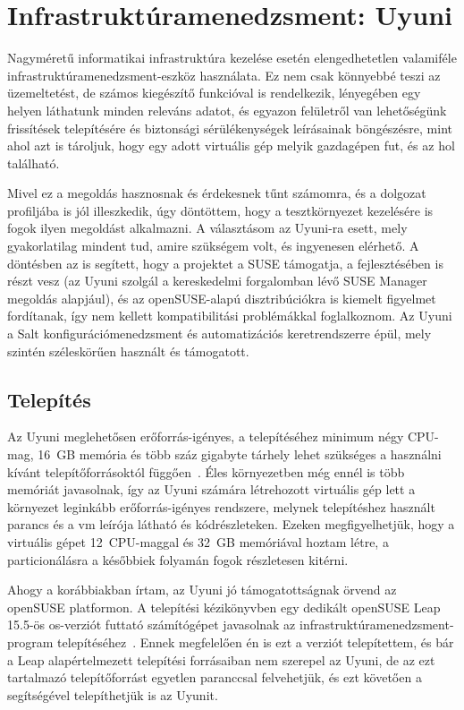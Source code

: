 
\chapter{Infrastruktúramenedzsment: Uyuni}
Nagyméretű informatikai infrastruktúra kezelése esetén elengedhetetlen valamiféle infrastruktúramenedzsment-eszköz használata. Ez nem csak könnyebbé teszi az üzemeltetést, de számos kiegészítő funkcióval is rendelkezik, lényegében egy helyen láthatunk minden releváns adatot, és egyazon felületről van lehetőségünk frissítések telepítésére és biztonsági sérülékenységek leírásainak böngészésre, mint ahol azt is tároljuk, hogy egy adott virtuális gép melyik gazdagépen fut, és az hol található.

Mivel ez a megoldás hasznosnak és érdekesnek tűnt számomra, és a dolgozat profiljába is jól illeszkedik, úgy döntöttem, hogy a tesztkörnyezet kezelésére is fogok ilyen megoldást alkalmazni. A választásom az Uyuni-ra esett, mely gyakorlatilag mindent tud, amire szükségem volt, és ingyenesen elérhető. A döntésben az is segített, hogy a projektet a SUSE támogatja, a fejlesztésében is részt vesz (az Uyuni szolgál a kereskedelmi forgalomban lévő SUSE Manager megoldás alapjául), és az openSUSE-alapú disztribúciókra is kiemelt figyelmet fordítanak, így nem kellett kompatibilitási problémákkal foglalkoznom. Az Uyuni a Salt konfigurációmenedzsment és automatizációs keretrendszerre épül, mely szintén széleskörűen használt és támogatott.


\section{Telepítés}
\label{sect:uyuni-install}
Az Uyuni meglehetősen erőforrás-igényes, a telepítéséhez minimum négy CPU-mag, 16~GB memória és  több száz gigabyte tárhely lehet szükséges a használni kívánt telepítőforrásoktól függően~\cite{UyuniInstallGuide}. Éles környezetben még ennél is több memóriát javasolnak, így az Uyuni számára létrehozott virtuális gép lett a környezet leginkább erőforrás-igényes rendszere, melynek telepítéshez használt parancs és a \acrshort{vm} leírója látható  és  kódrészleteken. Ezeken megfigyelhetjük, hogy a virtuális gépet 12~CPU-maggal és 32~GB memóriával hoztam létre, a particionálásra a későbbiek folyamán fogok részletesen kitérni.

Ahogy a korábbiakban írtam, az Uyuni jó támogatottságnak örvend az openSUSE platformon. A telepítési kézikönyvben egy dedikált openSUSE Leap 15.5-ös \acrshort{os}-verziót futtató számítógépet javasolnak az infrastruktúramenedzsment-program telepítéséhez~\cite{UyuniInstallGuide}.
Ennek megfelelően én is ezt a verziót telepítettem, és bár a Leap alapértelmezett telepítési forrásaiban nem szerepel az Uyuni, de az ezt tartalmazó telepítőforrást egyetlen paranccsal felvehetjük, és ezt követően a segítségével telepíthetjük is az Uyunit.


